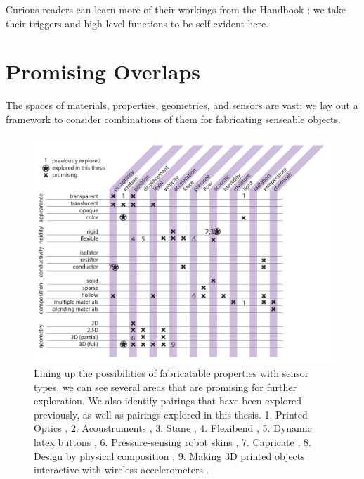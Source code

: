 
Curious readers can learn more of their workings from the Handbook \cite{fraden-modernsensors}; we take their triggers and high-level functions to be self-evident here.

\section{Promising Overlaps}

The spaces of materials, properties, geometries, and sensors are vast: we lay out a framework to consider combinations of them for fabricating senseable objects.

\begin{figure}
\centering
\includegraphics[width=6in]{figures/sensing-fab.pdf}
\caption{Lining up the possibilities of fabricatable properties with sensor types, we can see several areas that are promising for further exploration. We also identify pairings that have been explored previously, as well as pairings explored in this thesis. 1. Printed Optics \cite{willis-printedoptics}, 2. Acoustruments \cite{laput-acoustruments}, 3. Stane \cite{murray-smith-stane}, 4. Flexibend \cite{chien-flexibend}, 5. Dynamic latex buttons \cite{harrison-buttons}, 6. Pressure-sensing robot skins \cite{slyper-pressure}, 7. Capricate \cite{schmitz-capricate}, 8. Design by physical composition \cite{doering-composition}, 9. Making 3D printed objects interactive with wireless accelerometers \cite{hook-making}.}
\label{fig:sensing-fab}
\end{figure}

